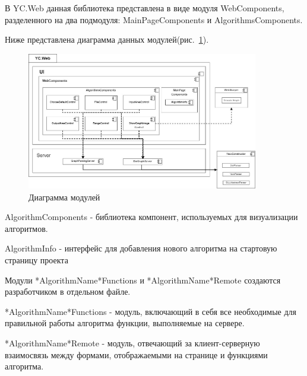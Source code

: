 \documentclass[14pt]{matmex-diploma}
\begin{document}
В YC.Web данная библиотека представлена в виде модуля \linebreak WebComponents, разделенного на два подмодуля: MainPageComponents и \linebreak AlgorithmsComponents. 	

Ниже представлена диаграмма данных модулей(рис.~\ref{3}).

\newpage

\begin{figure}[h]
\label{3}
\centering
\includegraphics[width=0.9\textwidth]{pictures/modules.jpg}
\caption{Диаграмма модулей}
\end{figure}

AlgorithmComponents - библиотека компонент, используемых для  визуализации алгоритмов.

AlgorithmInfo - интерфейс для добавления нового алгоритма на стартовую страницу проекта

Модули *AlgorithmName*Functions и *AlgorithmName*Remote создаются разработчиком в отдельном файле.

*AlgorithmName*Functions - модуль, включающий в себя все необходимые для правильной работы алгоритма функции, выполняемые на сервере.

*AlgorithmName*Remote - модуль, отвечающий за клиент-серверную взаимосвязь между формами, отображаемыми на странице и функциями алгоритма.


\end{document}
